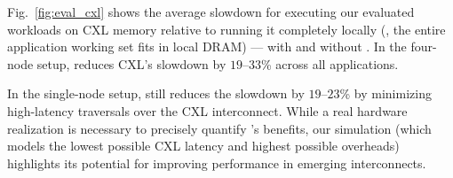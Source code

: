 
Fig.~\ref{fig:eval_cxl} shows the average slowdown for executing our evaluated workloads on CXL memory relative to running it completely locally (\ie, the entire application working set fits in local DRAM) --- with and without \pulse. In the four-node setup, \pulse reduces CXL's slowdown by $19$--$33$\% across all applications. 

In the single-node setup, \pulse still reduces the slowdown by $19$--$23$\% by minimizing high-latency traversals over the CXL interconnect. While a real hardware realization is necessary to precisely quantify \pulse's benefits, our simulation (which models the lowest possible CXL latency and highest possible \pulse overheads) highlights its potential for improving performance in emerging interconnects.
